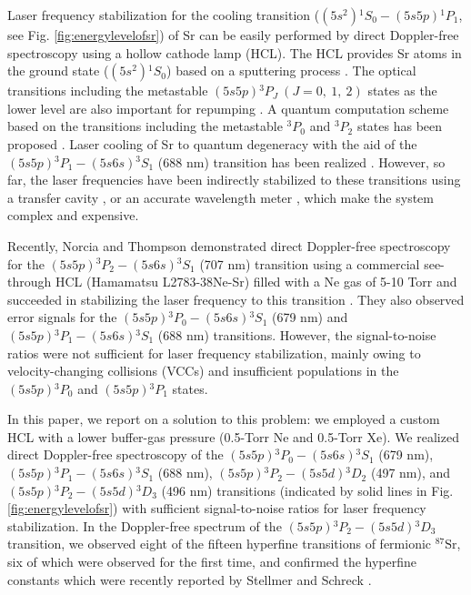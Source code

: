 \documentclass[twocolumn,10pt,a4paper]{article}
\begin{document}
Laser frequency stabilization for the cooling transition ($(5s^2) {}^1S_0-(5s5p){}^1P_1$, see Fig. \ref{fig:energylevelofsr}) of Sr can be easily performed by direct Doppler-free spectroscopy using a hollow cathode lamp (HCL). The HCL provides Sr atoms in the ground state ($(5s^2) {}^1S_0$) based on a sputtering process \cite{461hcl, simple461nmlasersystem}. The optical transitions including the metastable $(5s5p){^3P_J\ (J=0,\ 1,\ 2)}$ states as the lower level are also important for repumping \cite{Srrepump, Srrepump2, Srrepump3, Srrepump4, Srrepump5, Srrepump6, energylevel3}. A quantum computation scheme based on the transitions including the metastable ${}^3P_0$ and ${}^3P_2$ states has been proposed \cite{QuantumComputation}.  Laser cooling of Sr to quantum degeneracy with the aid of the $(5s5p){}^3P_1-(5s6s){}^3S_1$ (688 nm) transition has been realized \cite{688app}. However, so far, the laser frequencies have been indirectly stabilized to these transitions using a transfer cavity \cite{transfercavity, transfercavity2}, or an accurate wavelength meter \cite{wavelengthmeter}, which make the system complex and expensive.

Recently, Norcia and Thompson demonstrated direct Doppler-free spectroscopy for the $(5s5p){}^3P_2-(5s6s){}^3S_1$ (707 nm) transition using a commercial see-through HCL (Hamamatsu L2783-38Ne-Sr) filled with a Ne gas of 5-10 Torr \cite{accurate} and succeeded in stabilizing the laser frequency to this transition \cite{707}. They also observed error signals for the $(5s5p){}^3P_0-(5s6s){}^3S_1$ (679 nm) and $(5s5p){}^3P_1-(5s6s){}^3S_1$ (688 nm) transitions. However, the signal-to-noise ratios were not sufficient for laser frequency stabilization, mainly owing to velocity-changing collisions (VCCs) and insufficient populations in the $(5s5p){}^3P_0$ and $(5s5p){}^3P_1$ states.

In this paper, we report on a solution to this problem: we employed a custom HCL with a lower buffer-gas pressure (0.5-Torr Ne and 0.5-Torr Xe). We realized direct Doppler-free spectroscopy of the $(5s5p){}^3P_0-(5s6s){}^3S_1$ (679 nm), $(5s5p){}^3P_1-(5s6s){}^3S_1$ (688 nm), $(5s5p){}^3P_2-(5s5d){}^3D_2$ (497 nm), and $(5s5p){}^3P_2-(5s5d){}^3D_3$ (496 nm) transitions  (indicated by solid lines in Fig. \ref{fig:energylevelofsr}) with sufficient signal-to-noise ratios for laser frequency stabilization. In the Doppler-free spectrum of the $(5s5p){}^3P_2-(5s5d){}^3D_3$ transition, we observed eight of the fifteen hyperfine transitions of fermionic $^{87}\mathrm{Sr}$, six of which were observed for the first time, and confirmed the hyperfine constants which were recently reported by Stellmer and Schreck \cite{energylevel3}.
\end{document}
